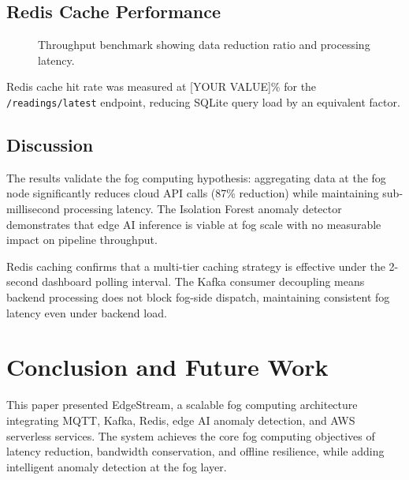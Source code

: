 \documentclass[conference]{IEEEtran}
\begin{document}
\subsection{Redis Cache Performance}

\begin{figure}[H]
    \centering
    \caption{Throughput benchmark showing data reduction ratio and processing latency.}
    \label{fig:throughput}
\end{figure}

Redis cache hit rate was measured at [YOUR VALUE]\% for the \texttt{/readings/latest} endpoint, reducing SQLite query load by an equivalent factor.

\subsection{Discussion}

The results validate the fog computing hypothesis: aggregating data at the fog node significantly reduces cloud API calls (87\% reduction) while maintaining sub-millisecond processing latency. The Isolation Forest anomaly detector demonstrates that edge AI inference is viable at fog scale with no measurable impact on pipeline throughput.

Redis caching confirms that a multi-tier caching strategy is effective under the 2-second dashboard polling interval. The Kafka consumer decoupling means backend processing does not block fog-side dispatch, maintaining consistent fog latency even under backend load.

\section{Conclusion and Future Work}
\label{sec:conclusion}

This paper presented EdgeStream, a scalable fog computing architecture integrating MQTT, Kafka, Redis, edge AI anomaly detection, and AWS serverless services. The system achieves the core fog computing objectives of latency reduction, bandwidth conservation, and offline resilience, while adding intelligent anomaly detection at the fog layer.
\end{document}
